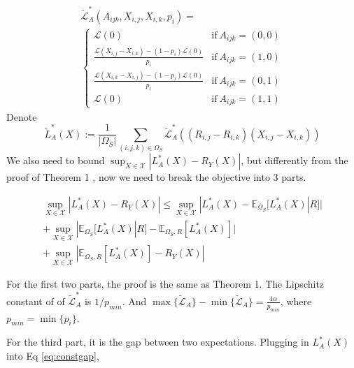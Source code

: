 \documentclass{article}
\numberwithin{equation}{section}
\newcommand{\supX}{\sup_{X \in \mathcal{X}}}
\newtheorem{sampling strategy}{Sampling Strategy}
\begin{document}
\begin{equation}
    \begin{aligned}
        & \tilde{\mathcal{L}}^*_A(A_{ijk}, X_{i,j}, X_{i,k}, p_i) = & \\
        & \begin{cases}
             \mathcal{L}(0) & \text{if}~ A_{ijk} = (0,0) \\
             \frac{ \mathcal{L}(X_{i,j} - X_{i,k}) - (1-p_i) \mathcal{L}(0)  }{p_i} &  \text{if}~ A_{ijk} = (1,0) \\
             \frac{ \mathcal{L}(X_{i,k} - X_{i,j}) - (1-p_i) \mathcal{L}(0) }{p_i} &  \text{if}~ A_{ijk} = (0,1) \\
             \mathcal{L}(0) &  \text{if}~ A_{ijk} = (1,1)
        \end{cases}
    \end{aligned}
    \label{eq:modifiedloss}
\end{equation}
Denote 
$$\tilde{L}^*_A(X) := \frac{1}{|\Omega_S|} \sum_{(i,j,k) \in \Omega_S}  \tilde{\mathcal{L}}^*_A( (R_{i,j} - R_{i,k})(X_{i,j} - X_{i,k}) )$$
We also need to bound $\supX |L_A^*(X) - R_Y(X)|$, but differently from the proof of Theorem 1%
, now we need to break the objective into 3 parts.

\begin{align}
    \supX |L_A^*(X) - R_Y(X)| \leq \supX |L_A^*(X) - \mathbb{E}_{\Omega_S} [L_A^*(X) | R] | \nonumber \\ 
    + \supX |\mathbb{E}_{\Omega_S} [L_A^*(X) | R] - \mathbb{E}_{\Omega_S, R} [L_A^*(X)]| \nonumber \\
    + \supX |\mathbb{E}_{\Omega_S, R} [L_A^*(X)] - R_Y(X) | \label{eq:constgap}
\end{align}

For the first two parts, the proof is the same as Theorem 1.
The Lipschitz  constant of  of $\tilde{\mathcal{L}}_A^*$ is $1/p_{min}$. And $\max\{ \tilde{\mathcal{L}}_A \} - \min\{\tilde{\mathcal{L}}_A\} = \frac{4\alpha}{p_{min}}$, where $p_{min} = \min \{ p_i \}$.

For the third part, it is the gap between two expectations. Plugging in  $L_A^*(X)$ into Eq \ref{eq:constgap}, 
\end{document}
